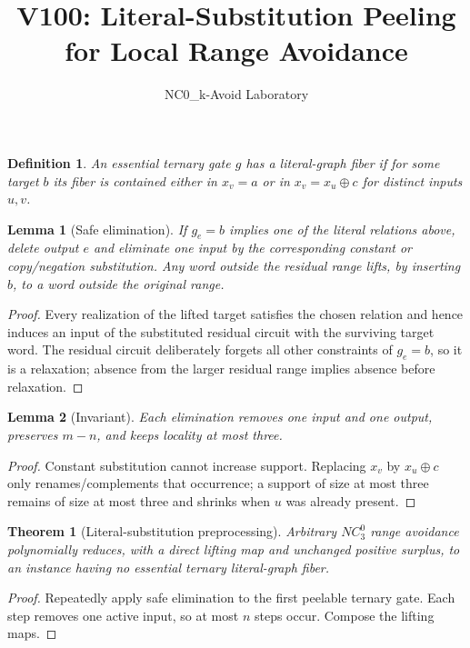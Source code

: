 \documentclass[11pt]{article}
\title{V100: Literal-Substitution Peeling for Local Range Avoidance}
\author{NC0\_k-Avoid Laboratory}
\date{}
\newtheorem{theorem}{Theorem}
\newtheorem{lemma}{Lemma}
\newtheorem{definition}{Definition}
\begin{document}
\maketitle

\begin{definition}
An essential ternary gate $g$ has a \emph{literal-graph fiber} if for some
target $b$ its fiber is contained either in $x_v=a$ or in
$x_v=x_u\oplus c$ for distinct inputs $u,v$.
\end{definition}

\begin{lemma}[Safe elimination]
If $g_e=b$ implies one of the literal relations above, delete output $e$ and
eliminate one input by the corresponding constant or copy/negation
substitution. Any word outside the residual range lifts, by inserting $b$, to a
word outside the original range.
\end{lemma}
\begin{proof}
Every realization of the lifted target satisfies the chosen relation and hence
induces an input of the substituted residual circuit with the surviving target
word. The residual circuit deliberately forgets all other constraints of
$g_e=b$, so it is a relaxation; absence from the larger residual range implies
absence before relaxation.
\end{proof}

\begin{lemma}[Invariant]
Each elimination removes one input and one output, preserves $m-n$, and keeps
locality at most three.
\end{lemma}
\begin{proof}
Constant substitution cannot increase support. Replacing $x_v$ by
$x_u\oplus c$ only renames/complements that occurrence; a support of size at
most three remains of size at most three and shrinks when $u$ was already
present.
\end{proof}

\begin{theorem}[Literal-substitution preprocessing]
Arbitrary $NC^0_3$ range avoidance polynomially reduces, with a direct lifting
map and unchanged positive surplus, to an instance having no essential ternary
literal-graph fiber.
\end{theorem}
\begin{proof}
Repeatedly apply safe elimination to the first peelable ternary gate. Each step
removes one active input, so at most $n$ steps occur. Compose the lifting maps.
\end{proof}
\end{document}
